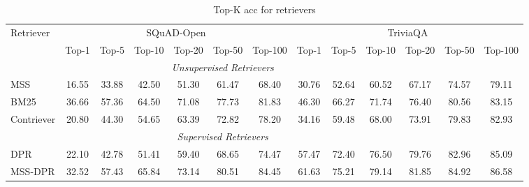 \begin{table*}[!ht]
\addtolength{\tabcolsep}{-0.65pt}
\small
\centering
\begin{tabular}{@{}l | c c c c c c | c c c c c c@{}}\toprule
Retriever & \multicolumn{6}{c}{SQuAD-Open} & \multicolumn{6}{c}{TriviaQA}  \\

& Top-1 & Top-5 &Top-10 & Top-20 &Top-50 & Top-100 & Top-1 & Top-5 &Top-10 & Top-20 &Top-50 & Top-100  \\
\midrule
\multicolumn{11}{c}{\textit{Unsupervised Retrievers}} \\
\midrule
MSS         &  16.55 & 33.88 &  42.50 & 51.30 &  61.47 & 68.40  &  30.76 & 52.64 & 60.52  &67.17 & 74.57& 79.11\\



BM25        & 36.66  &   57.36 &  64.50 & 71.08  & 77.73  & 81.83    & 46.30  & 66.27 &  71.74 &  76.40 & 80.56 & 83.15 \\


Contriever &   20.80 &  44.30 & 54.65  & 63.39 & 72.82 &  78.20 & 34.16  & 59.48 &  68.00 &73.91  & 79.83& 82.93\\


\midrule
\multicolumn{11}{c}{\textit{Supervised Retrievers}} \\
\midrule
DPR     &  22.10 & 42.78 &  51.41 &  59.40 &  68.65 &  74.47   &     57.47 & 72.40 & 76.50  & 79.76 &  82.96 & 85.09 \\
MSS-DPR    &  32.52 &57.43 &  65.84 & 73.14  &  80.51 &  84.45    & 61.63  & 75.21 &  79.14  &81.85  & 84.92 &86.58 \\





\midrule
\end{tabular}
\caption{ Top-K acc for retrievers
}
\label{tab:qa2}
\end{table*}


